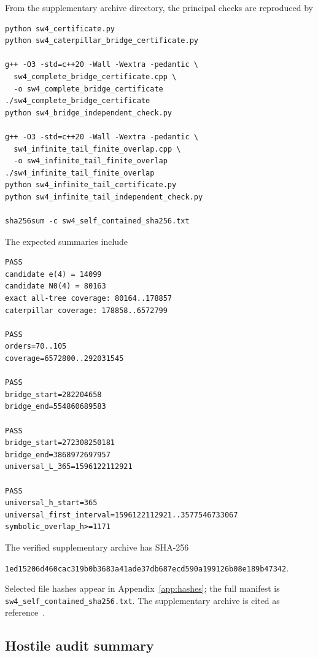 \documentclass[11pt]{article}
\theoremstyle{definition}
\theoremstyle{remark}
\newcommand{\code}[1]{\nolinkurl{#1}}
\begin{document}
From the supplementary archive directory, the principal checks are reproduced
by
\begin{lstlisting}[basicstyle=\ttfamily\small,frame=single]
python sw4_certificate.py
python sw4_caterpillar_bridge_certificate.py

g++ -O3 -std=c++20 -Wall -Wextra -pedantic \
  sw4_complete_bridge_certificate.cpp \
  -o sw4_complete_bridge_certificate
./sw4_complete_bridge_certificate
python sw4_bridge_independent_check.py

g++ -O3 -std=c++20 -Wall -Wextra -pedantic \
  sw4_infinite_tail_finite_overlap.cpp \
  -o sw4_infinite_tail_finite_overlap
./sw4_infinite_tail_finite_overlap
python sw4_infinite_tail_certificate.py
python sw4_infinite_tail_independent_check.py

sha256sum -c sw4_self_contained_sha256.txt
\end{lstlisting}
The expected summaries include
\begin{lstlisting}[basicstyle=\ttfamily\small,frame=single]
PASS
candidate e(4) = 14099
candidate N0(4) = 80163
exact all-tree coverage: 80164..178857
caterpillar coverage: 178858..6572799

PASS
orders=70..105
coverage=6572800..292031545

PASS
bridge_start=282204658
bridge_end=554860689583

PASS
bridge_start=272308250181
bridge_end=3868972697957
universal_L_365=1596122112921

PASS
universal_h_start=365
universal_first_interval=1596122112921..3577546733067
symbolic_overlap_h>=1171
\end{lstlisting}

The verified supplementary archive has SHA-256
\begin{center}
\code{1ed15206d460cac319b0b3683a41ade37db687ecd590a199126b08e189b47342}.
\end{center}
Selected file hashes appear in Appendix~\ref{app:hashes}; the full manifest is
\code{sw4_self_contained_sha256.txt}.  The supplementary archive is cited
as reference~\cite{supplement}.

\subsection{Hostile audit summary}
\end{document}
